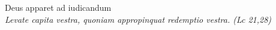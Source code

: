 


\def\greinitialformat#1{%
{\fontsize{39}{39}\selectfont #1}%
}




\vspace{0.3cm}
\begin{center}
 
Deus apparet ad iudicandum\\
\textit{\small Levate capita vestra, quoniam appropinquat redemptio vestra. (Lc 21,28)}
\end{center}
